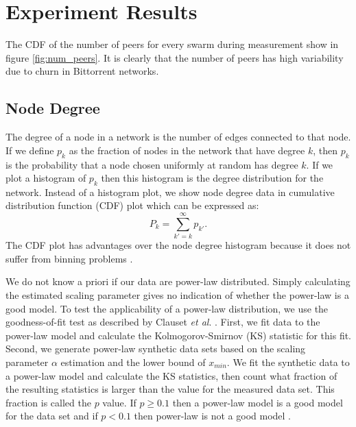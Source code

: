 \documentclass[10pt,conference,letterpaper]{IEEEtran}
\begin{document}
\section{Experiment Results}\label{result}
The CDF of the number of peers for every swarm during measurement show in figure \ref{fig:num_peers}. 
It is clearly that the number of peers has high variability due to churn in Bittorrent networks. 

\subsection{Node Degree}
The degree of a node in a network is the number of edges connected to that node. 
If we define $p_k$ as the  fraction of nodes in the network that have degree $k$, then $p_k$ is the probability that a node chosen uniformly at random has degree $k$. 
If we plot a histogram of $p_k$ then this histogram is the degree distribution for  the network. 
Instead of a histogram plot,  we show node degree data in cumulative distribution  function (CDF) plot which can be expressed as:
\begin{equation}
P_k = \sum_{k'=k}^{\infty} p_{k'}.
\end{equation}
The CDF plot has advantages over the node degree histogram because it does not suffer from binning problems  \cite{newman2003structure}.

We do not know a priori if our data are power-law distributed. 
Simply calculating the estimated scaling parameter gives no indication of  whether the power-law is a good model.  
To test the applicability of a power-law distribution, we use the goodness-of-fit test as described by Clauset \textit{et al}. \cite{clauset2009power}. 
First, we fit data to the power-law model and calculate the Kolmogorov-Smirnov (KS) statistic for this fit. 
Second, we generate power-law synthetic data sets based on the scaling parameter $\alpha$ estimation and the lower bound of $x_{min}$. 
We fit the synthetic data to a power-law model and calculate the KS statistics, then count what fraction of the resulting statistics is larger than the value for the measured data set. 
This fraction is called the $p$ value.  
If $p \geq 0.1$ then a power-law model is a good model for the data set and if $p < 0.1$ then power-law is not a good model \cite{clauset2009power}.
\end{document}
